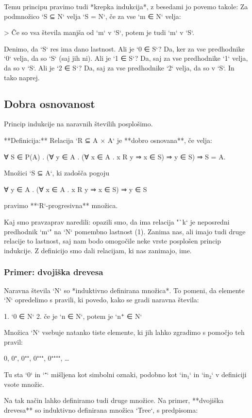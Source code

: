 Temu principu pravimo tudi *krepka indukcija*, z besedami jo povemo takole:
Za podmnožico `S ⊆ N` velja `S = N`, če za vse `m ∈ N` velja:

> Če so vsa števila manjša od `m` v `S`, potem je tudi `m` v `S`.

Denimo, da `S` res ima dano lastnost. Ali je `0 ∈ S`? Da, ker za vse predhodnike `0` velja, da
so `S` (saj jih ni). Ali je `1 ∈ S`? Da, saj za vse predhodnike `1` velja, da so v `S`. Ali je `2 ∈
S`? Da, saj za vse predhodnike `2` velja, da so v `S`. In tako naprej.

\subsection{Dobra osnovanost}

Princip indukcije na naravnih številih posplošimo.

**Definicija:** Relacija `R ⊆ A × A` je **dobro osnovana**, če velja:

    ∀ S ∈ P(A) . (∀ y ∈ A . (∀ x ∈ A . x R y ⇒ x ∈ S) ⇒ y ∈ S) ⇒ S = A.

Množici `S ⊆ A`, ki zadošča pogoju

    ∀ y ∈ A . (∀ x ∈ A . x R y ⇒ x ∈ S) ⇒ y ∈ S

pravimo **`R`-progresivna** množica.

Kaj smo pravzaprav naredili: opazili smo, da ima relacija "`k` je neposredni predhodnik
`m`" na `N` pomembno lastnost (1). Zanima nas, ali imajo tudi druge relacije to lastnost,
saj nam bodo omogočile neke vrste posplošen princip indukcije. Z definicijo smo dali
relacijam, ki nas zanimajo, ime.

\subsubsection{Primer: dvojiška drevesa}

Naravna števila `N` so *induktivno definirana množica*. To pomeni, da elemente `N`
opredelimo s pravili, ki povedo, kako se gradi naravna števila:

1. `0 ∈ N`
2. če je `n ∈ N`, potem je `n⁺ ∈ N`

Množica `N` vsebuje natanko tiste elemente, ki jih lahko zgradimo s pomočjo teh pravil:

    0, 0⁺, 0⁺⁺, 0⁺⁺⁺, 0⁺⁺⁺⁺, …

Tu sta `0` in `⁺` mišljena kot simbolni oznaki, podobno kot `in₁` in `in₂` v definiciji
vsote množic.

Na tak način lahko definiramo tudi druge množice. Na primer, **dvojiška drevesa** so
induktivno definirana množica `Tree`, s predpisoma:

